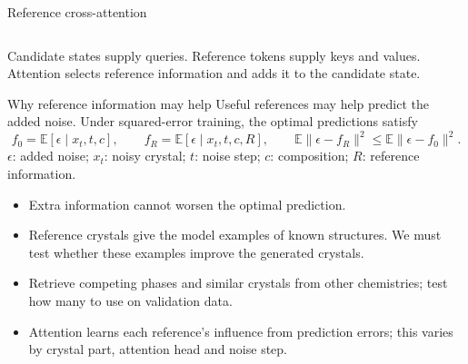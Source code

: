 \documentclass[10pt,aspectratio=169]{beamer}
\begin{document}
\begin{frame}{Reference cross-attention}
\begin{columns}[c]
\centering
\denoisercell
{}\centering
\crosscell
\end{columns}
\vspace{1mm}\small Candidate states supply queries. Reference tokens supply keys and values. Attention selects reference information and adds it to the candidate state.
\end{frame}

\begin{frame}{Why reference information may help}
\small
Useful references may help predict the added noise. Under squared-error training, the optimal predictions satisfy
\[
 f_0=\mathbb E[\epsilon\mid x_t,t,c],\qquad
 f_R=\mathbb E[\epsilon\mid x_t,t,c,R],\qquad
 \mathbb E\|\epsilon-f_R\|^2\leq\mathbb E\|\epsilon-f_0\|^2.
\]
{\footnotesize $\epsilon$: added noise; $x_t$: noisy crystal; $t$: noise step; $c$: composition; $R$: reference information.}
\vspace{2mm}
\begin{itemize}\setlength\itemsep{1.5mm}
\item Extra information cannot worsen the optimal prediction.
\item Reference crystals give the model examples of known structures. We must test whether these examples improve the generated crystals.
\item Retrieve competing phases and similar crystals from other chemistries; test how many to use on validation data.
\item Attention learns each reference's influence from prediction errors; this varies by crystal part, attention head and noise step.
\end{itemize}
\vspace{2mm}
\end{frame}
\end{document}
